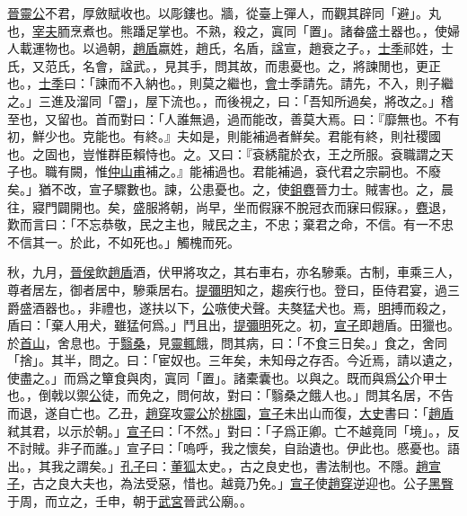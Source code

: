 \documentclass{article}
\newcommand{\tsu}{\small\kaishu\color{brown}}
\begin{document}
\uline{晉靈公}不君，厚斂{\tsu 賦收也。}以彫{\tsu 鏤也。}牆，從臺上彈人，而觀其辟{\tsu 同「避」。}丸也，\uline{宰夫}胹{\tsu 烹煮也。}熊蹯{\tsu 足掌也。}不熟，殺之，寘{\tsu 同「置」。}諸畚{\tsu 盛土器也。}，使婦人載{\tsu 運物也。}以過朝，\uline{趙盾}{\tsu 嬴姓，趙氏，名盾，諡宣，趙衰之子。}，\uline{士季}{\tsu 祁姓，士氏，又范氏，名會，諡武。}，見其手，問其故，而患{\tsu 憂也。}之，將諫{\tsu 閒也，更正也。}，\uline{士季}曰：「諫而不入{\tsu 納也。}，則莫之繼也，\uline{會}{\tsu 士季請先。}請先，不入，則子繼之。」三進及溜{\tsu 同「霤」，屋下流也。}，而後視之，曰：「吾知所過矣，將改之。」稽{\tsu 至也，又留也。}首而對曰：「人誰無過，過而能改，善莫大焉。曰：『靡{\tsu 無也。}不有初，鮮{\tsu 少也。}克{\tsu 能也。}有終。』夫如是，則能補過者鮮矣。君能有終，則社稷{\tsu 國也。}之固也，豈惟群臣賴{\tsu 恃也。}之。又曰：『袞{\tsu 綉龍於衣，王之所服。袞職謂之天子也。}職有闕，惟\uline{仲山甫}補之。』能補過也。君能補過，袞{\tsu 代君之宗嗣也。}不廢矣。」猶不改，宣子驟{\tsu 數也。}諫，公患{\tsu 憂也。}之，使\uline{鉏麑}{\tsu 晉力士。}賊{\tsu 害也。}之，晨往，寢門闢{\tsu 開也。}矣，盛服將朝，尚早，坐而假寐{\tsu 不脫冠衣而寐曰假寐。}，\uline{麑}退，歎而言曰：「不忘恭敬，民之主也，賊民之主，不忠；棄君之命，不信。有一{\tsu 不忠不信其一。}於此，不如死也。」觸槐而死。

秋，九月，\uline{晉侯}飲\uline{趙盾}酒，伏甲將攻之，其右{\tsu 車右，亦名驂乘。古制，車乘三人，尊者居左，御者居中，驂乘居右。}\uline{提彌明}知之，趨{\tsu 疾行也。}登曰，臣侍君宴，過三爵{\tsu 盛酒器也。}，非禮也，遂扶以下，\uline{公}嗾{\tsu 使犬聲。}夫獒{\tsu 猛犬也。}焉，\uline{明}搏而殺之，盾曰：「棄人用犬，雖猛何爲。」鬥且出，\uline{提彌明}死之。初，\uline{宣子}{\tsu 即趙盾。}田{\tsu 獵也。}於\uline{首山}，舍{\tsu 息也。}于\uline{翳桑}，見\uline{靈輒}餓，問其病，曰：「不食三日矣。」食之，舍{\tsu 同「捨」。}其半，問之。曰：「宦{\tsu 奴也。}三年矣，未知母之存否。今近焉，請以遺之，使盡之。」而爲之簞食與肉，寘{\tsu 同「置」。}諸橐{\tsu 囊也。}以與之。既而與爲\uline{公}介{\tsu 甲士也。}，倒戟以禦\uline{公}徒，而免之，問何故，對曰：「翳桑之餓人也。」問其名居，不告而退，遂自亡也。乙丑，\uline{趙穿}攻\uline{靈公}於\uline{桃園}，\uline{宣子}未出山而復，\uline{大史}書曰：「\uline{趙盾}弒其君，以示於朝。」\uline{宣子}曰：「不然。」對曰：「子爲正卿。亡不越竟{\tsu 同「境」。}，反不討賊。非子而誰。」宣子曰：「嗚呼，我之懷矣，自詒{\tsu 遺也。}伊{\tsu 此也。}慼{\tsu 憂也。}{\tsu 語出。}，其我之謂矣。」\uline{孔子}曰：\uline{董狐}{\tsu 太史。}，古之良史也，書法{\tsu 制也。}不隱。\uline{趙宣子}，古之良大夫也，為法受惡，惜也。越竟乃免。」\uline{宣子}使\uline{趙穿}逆{\tsu 迎也。}公子\uline{黑臀}于周，而立之，壬申，朝于\uline{武宮}{\tsu 晉武公廟。}。
\end{document}
